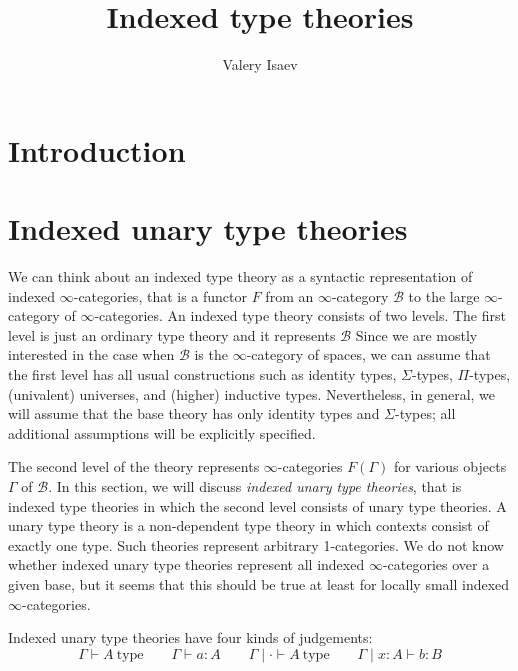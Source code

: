 \documentclass[reqno]{amsart}
\theoremstyle{definition}
\theoremstyle{remark}
\newcommand{\type}{\mathrm{type}}
\newcommand{\ob}{\mathrm{type}}
\numberwithin{figure}{section}
\begin{document}
\title{Indexed type theories}

\author{Valery Isaev}

\begin{abstract}
\end{abstract}

\maketitle

\section{Introduction}

\section{Indexed unary type theories}

We can think about an indexed type theory as a syntactic representation of indexed $\infty$-categories, that is a functor $F$ from an $\infty$-category $\mathcal{B}$ to the large $\infty$-category of $\infty$-categories.
An indexed type theory consists of two levels.
The first level is just an ordinary type theory and it represents $\mathcal{B}$
Since we are mostly interested in the case when $\mathcal{B}$ is the $\infty$-category of spaces,
we can assume that the first level has all usual constructions such as identity types, $\Sigma$-types, $\Pi$-types, (univalent) universes, and (higher) inductive types.
Nevertheless, in general, we will assume that the base theory has only identity types and $\Sigma$-types; all additional assumptions will be explicitly specified.

The second level of the theory represents $\infty$-categories $F(\Gamma)$ for various objects $\Gamma$ of $\mathcal{B}$.
In this section, we will discuss \emph{indexed unary type theories}, that is indexed type theories in which the second level consists of unary type theories.
A unary type theory is a non-dependent type theory in which contexts consist of exactly one type.
Such theories represent arbitrary 1-categories.
We do not know whether indexed unary type theories represent all indexed $\infty$-categories over a given base, but it seems that this should be true at least for locally small indexed $\infty$-categories.

Indexed unary type theories have four kinds of judgements:
\[ \Gamma \vdash A\ \type \qquad \Gamma \vdash a : A \qquad \Gamma \mid \cdot \vdash A\ \ob \qquad \Gamma \mid x : A \vdash b : B \]
\end{document}
